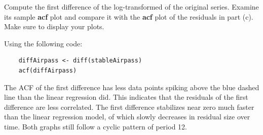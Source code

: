 Compute the first difference of the log-transformed of the original series. Examine its sample \textbf{acf} plot and compare it with the \textbf{acf} plot of the residuals in part (c). Make sure to display your plots.

\nl Using the following code:
\begin{verbatim}
    diffAirpass <- diff(stableAirpass)
    acf(diffAirpass)
\end{verbatim}


\nl The ACF of the first difference has less data points spiking above the blue dashed line than the linear regression did. This indicates that the residuals of the first difference are less correlated. The first difference stabilizes near zero much faster than the linear regression model, of which slowly decreases in residual size over time. Both graphs still follow a cyclic pattern of period 12.